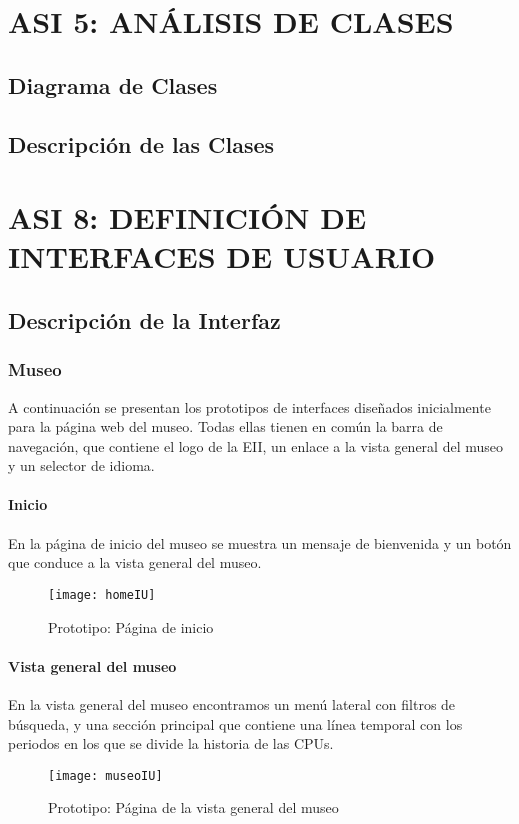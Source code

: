 \newpage
\section{ASI 5: ANÁLISIS DE CLASES}

\subsection{Diagrama de Clases} 

\subsection{Descripción de las Clases}


\newpage
\section{ASI 8: DEFINICIÓN DE INTERFACES DE USUARIO}

\subsection{Descripción de la Interfaz} 
\subsubsection{Museo}
A continuación se presentan los prototipos de interfaces diseñados inicialmente para la página web del museo. Todas ellas tienen en común la barra de navegación, que contiene el logo de la EII, un enlace a la vista general del museo y un selector de idioma.
\paragraph*{Inicio}
En la página de inicio del museo se muestra un mensaje de bienvenida y un botón que conduce a la vista general del museo.
\begin{figure}[H]
\centering
\texttt{[image: homeIU]}
\caption{Prototipo: Página de inicio}
\end{figure}
\paragraph*{Vista general del museo}
En la vista general del museo encontramos un menú lateral con filtros de búsqueda, y una sección principal que contiene una línea temporal con los periodos en los que se divide la historia de las CPUs.
\begin{figure}[H]
\centering
\texttt{[image: museoIU]}
\caption{Prototipo: Página de la vista general del museo}
\end{figure}
